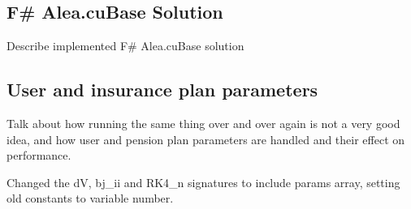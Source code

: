 \subsection{F\# Alea.cuBase Solution}
Describe implemented F\# Alea.cuBase solution

\subsection{User and insurance plan parameters}
Talk about how running the same thing over and over again is not a very good idea, and how user and pension plan parameters are handled and their effect on performance.

Changed the dV, bj\_ii and RK4\_n signatures to include params array, setting old constants to variable number.
